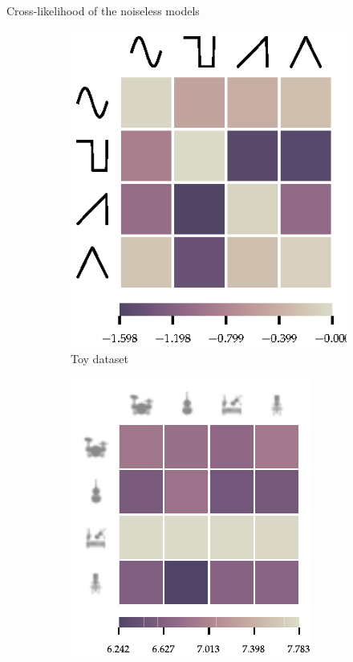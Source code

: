 \documentclass{beamer}
\begin{document}
\begin{frame}{Cross-likelihood of the noiseless models}
\begin{figure}
\begin{subfigure}{0.29\textwidth}
            \includegraphics[width=\textwidth]{toy_noise_0/wn_channels_hm}%
            \caption{Toy dataset}%
        \end{subfigure}
        \begin{subfigure}{0.29\textwidth}
            \includegraphics[width=\textwidth]{musdb_noiseless/channels_hm}\\%

\end{subfigure}
\end{figure}
\end{frame}
\end{document}
